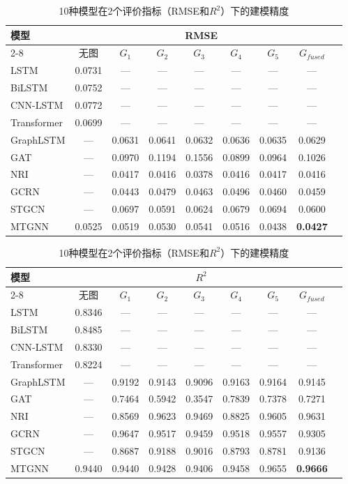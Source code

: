\begin{table}[htbp]
\centering
\caption{10种模型在2个评价指标（RMSE和$R^2$）下的建模精度}
\label{tab:appA-accuracy}
\small
\begin{tabular}{lcccccccc}
\toprule
\multirow{2}{*}{模型} & \multicolumn{7}{c}{RMSE} \\
\cmidrule{2-8}
 & 无图 & $G_1$ & $G_2$ & $G_3$ & $G_4$ & $G_5$ & $G_{fused}$ \\
\midrule
LSTM & 0.0731 & --- & --- & --- & --- & --- & --- \\
BiLSTM & 0.0752 & --- & --- & --- & --- & --- & --- \\
CNN-LSTM & 0.0772 & --- & --- & --- & --- & --- & --- \\
Transformer & 0.0699 & --- & --- & --- & --- & --- & --- \\
GraphLSTM & --- & 0.0631 & 0.0641 & 0.0632 & 0.0636 & 0.0635 & 0.0629 \\
GAT & --- & 0.0970 & 0.1194 & 0.1556 & 0.0899 & 0.0964 & 0.1026 \\
NRI & --- & 0.0417 & 0.0416 & 0.0378 & 0.0416 & 0.0417 & 0.0416 \\
GCRN & --- & 0.0443 & 0.0479 & 0.0463 & 0.0496 & 0.0460 & 0.0459 \\
STGCN & --- & 0.0697 & 0.0591 & 0.0624 & 0.0679 & 0.0694 & 0.0600 \\
MTGNN & 0.0525 & 0.0519 & 0.0530 & 0.0541 & 0.0516 & 0.0438 & \textbf{0.0427} \\
\bottomrule
\end{tabular}

\vspace{6pt}

\begin{tabular}{lcccccccc}
\toprule
\multirow{2}{*}{模型} & \multicolumn{7}{c}{$R^2$} \\
\cmidrule{2-8}
 & 无图 & $G_1$ & $G_2$ & $G_3$ & $G_4$ & $G_5$ & $G_{fused}$ \\
\midrule
LSTM & 0.8346 & --- & --- & --- & --- & --- & --- \\
BiLSTM & 0.8485 & --- & --- & --- & --- & --- & --- \\
CNN-LSTM & 0.8330 & --- & --- & --- & --- & --- & --- \\
Transformer & 0.8224 & --- & --- & --- & --- & --- & --- \\
GraphLSTM & --- & 0.9192 & 0.9143 & 0.9096 & 0.9163 & 0.9164 & 0.9145 \\
GAT & --- & 0.7464 & 0.5942 & 0.3547 & 0.7839 & 0.7378 & 0.7271 \\
NRI & --- & 0.8569 & 0.9623 & 0.9469 & 0.8825 & 0.9605 & 0.9631 \\
GCRN & --- & 0.9647 & 0.9517 & 0.9459 & 0.9518 & 0.9557 & 0.9305 \\
STGCN & --- & 0.8687 & 0.9188 & 0.9016 & 0.8793 & 0.8781 & 0.9136 \\
MTGNN & 0.9440 & 0.9440 & 0.9428 & 0.9406 & 0.9458 & 0.9655 & \textbf{0.9666} \\
\bottomrule
\end{tabular}
\end{table}

